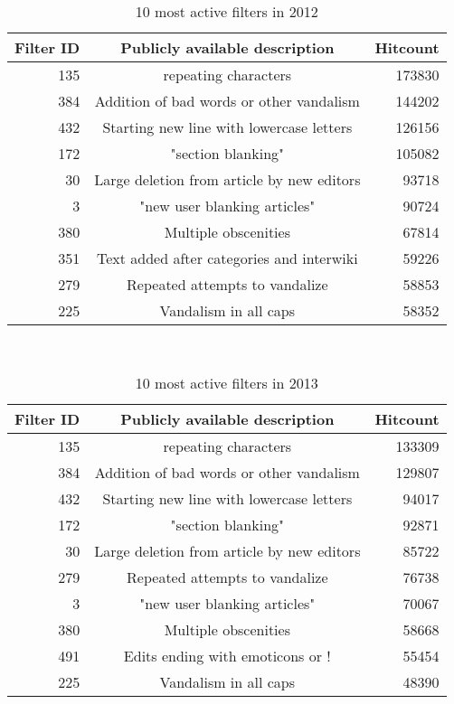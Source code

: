 \begin{table}
  \centering
  \begin{tabular}{r c r }
    Filter ID & Publicly available description & Hitcount \\
    \hline
    135 & repeating characters & 173830 \\
    384 & Addition of bad words or other vandalism & 144202 \\
    432 & Starting new line with lowercase letters & 126156 \\
    172 & "section blanking" & 105082 \\
    30 & Large deletion from article by new editors & 93718 \\
    3 & "new user blanking articles" & 90724 \\
    380 & Multiple obscenities & 67814 \\
    351 & Text added after categories and interwiki & 59226 \\
    279 & Repeated attempts to vandalize & 58853 \\
    225 & Vandalism in all caps & 58352 \\
  \end{tabular}
  \caption{10 most active filters in 2012}~\label{tab:most-active-2012}
\end{table}

\begin{table}
  \centering
  \begin{tabular}{r c r }
    Filter ID & Publicly available description & Hitcount \\
    \hline
    135 & repeating characters & 133309 \\
    384 & Addition of bad words or other vandalism & 129807 \\
    432 & Starting new line with lowercase letters & 94017 \\
    172 & "section blanking" & 92871 \\
    30 & Large deletion from article by new editors & 85722 \\
    279 & Repeated attempts to vandalize & 76738 \\
    3 & "new user blanking articles" & 70067 \\
    380 & Multiple obscenities & 58668 \\
    491 & Edits ending with emoticons or ! & 55454 \\
    225 & Vandalism in all caps & 48390 \\
  \end{tabular}
  \caption{10 most active filters in 2013}~\label{tab:most-active-2013}
\end{table}

